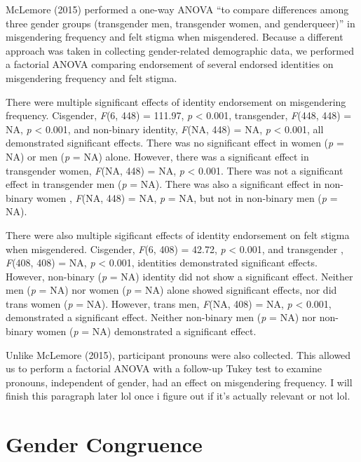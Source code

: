\documentclass[12pt,twoside]{reedthesis}
\begin{document}
McLemore (2015) performed a one-way ANOVA ``to compare differences among three gender groups (transgender men, transgender women, and genderqueer)'' in misgendering frequency and felt stigma when misgendered.
Because a different approach was taken in collecting gender-related demographic data, we performed a factorial ANOVA comparing endorsement of several endorsed identities on misgendering frequency and felt stigma.

There were multiple significant effects of identity endorsement on misgendering frequency.
Cisgender, \emph{F}(6, 448) = 111.97, \emph{p} \textless{} 0.001,
transgender, \emph{F}(448, 448) = NA, \emph{p} \textless{} 0.001,
and non-binary identity, \emph{F}(NA, 448) = NA, \emph{p} \textless{} 0.001, all demonstrated significant effects.
There was no significant effect in women (\emph{p} = NA) or men (\emph{p} = NA) alone.
However, there was a significant effect in transgender women, \emph{F}(NA, 448) = NA, \emph{p} \textless{} 0.001.
There was not a significant effect in transgender men (\emph{p} = NA).
There was also a significant effect in non-binary women , \emph{F}(NA, 448) = NA, \emph{p} = NA,
but not in non-binary men (\emph{p} = NA).

There were also multiple sigificant effects of identity endorsement on felt stigma when misgendered.
Cisgender, \emph{F}(6, 408) = 42.72, \emph{p} \textless{} 0.001,
and transgender , \emph{F}(408, 408) = NA, \emph{p} \textless{} 0.001, identities demonstrated significant effects.
However, non-binary (\emph{p} = NA) identity did not show a significant effect.
Neither men (\emph{p} = NA) nor women (\emph{p} = NA) alone showed significant effects, nor did trans women (\emph{p} = NA).
However, trans men, \emph{F}(NA, 408) = NA, \emph{p} \textless{} 0.001, demonstrated a significant effect.
Neither non-binary men (\emph{p} = NA) nor non-binary women (\emph{p} = NA) demonstrated a significant effect.

Unlike McLemore (2015), participant pronouns were also collected. This allowed us to perform a factorial ANOVA with a follow-up Tukey test to examine pronouns, independent of gender, had an effect on misgendering frequency. I will finish this paragraph later lol once i figure out if it's actually relevant or not lol.

\hypertarget{gender-congruence}{%
\section{Gender Congruence}\label{gender-congruence}}
\end{document}

